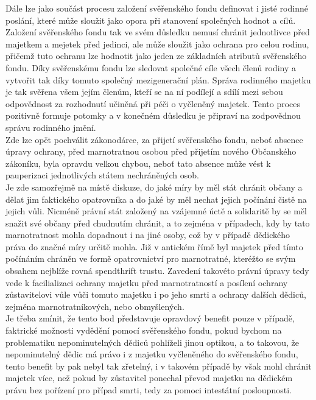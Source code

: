 \documentclass{article}
\begin{document}
 Dále lze jako součást procesu založení svěřenského fondu definovat i jisté rodinné poslání, které může sloužit jako opora při stanovení společných hodnot a cílů. Založení svěřenského fondu tak ve svém důsledku nemusí chránit jednotlivce před majetkem a mejetek před jedinci, ale může sloužit jako ochrana pro celou rodinu, přičemž tuto ochranu lze hodnotit jako jeden ze základních atributů svěřenského fondu. Díky svěřenskému fondu lze sledovat společné cíle všech členů rodiny a vytvořit tak díky tomuto společný mezigenerační plán. Správa rodinného majetku je tak svěřena všem jejím členům, kteří se na ní podílejí a sdílí mezi sebou odpovědnost za rozhodnutí učiněná při péči o vyčleněn\-ý majetek. Tento proces pozitivně formuje potomky a v konečném důsledku je připraví na zodpovědnou správu rodinného jmění.\\
 
 Zde lze opět pochválit zákonodárce, za přijetí svěřenského fondu, neboť absence úpravy ochrany, před marnotratnou osobou před přijetím nového Občanského zákoníku, byla opravdu velkou chybou, neboť tato absence může vést k pauperizaci jednotlivých státem nechráněných osob.\\
 
 Je zde samozřejmě na místě diskuze, do jaké míry by měl stát chránit občany a dělat jim faktického opatrovníka a do jaké by měl nechat jejich počínání čistě na jejich vůli. Nicméně právní stát založený na vzájemné úctě a solidaritě by se měl snažit své občany před chudnutím chránit, a to zejména v případech, kdy by tato marnotratnost mohla dopadnout i na jiné osoby, což by v případě dědického práva do značné míry určitě mohla. Již v antickém římě byl majetek před tímto počínáním chráněn ve formě opatrovnictví pro marnotratné, kteréžto se svým obsahem nejblíže rovná spendthrift trustu. Zavedení takovéto právní úpravy tedy vede k facilializaci ochrany majetku před marnotratností a posílení ochrany zůstavitelovi vůle vůči tomuto majetku i po jeho smrti a ochrany dalších dědiců, zejména marnotratníkových, nebo obmyšlených.\\
 
 
 Je třeba zmínit, že tento bod představuje opravdový benefit pouze v případě, faktrické možnosti vydědění pomocí svěřenského fondu, pokud bychom na problematiku nepominutelných dědiců pohlíželi jinou optikou, a to takovou, že nepominutelný dědic má právo i z majetku vyčleněného do svěřenského fondu, tento benefit by pak nebyl tak zřetelný, i v takovém případě by však mohl chránit majetek více, než pokud by zůstavitel ponechal převod majetku na dědickém právu bez pořízení pro případ smrti, tedy za pomoci intestátní posloupnosti.\\
 
\end{document}
